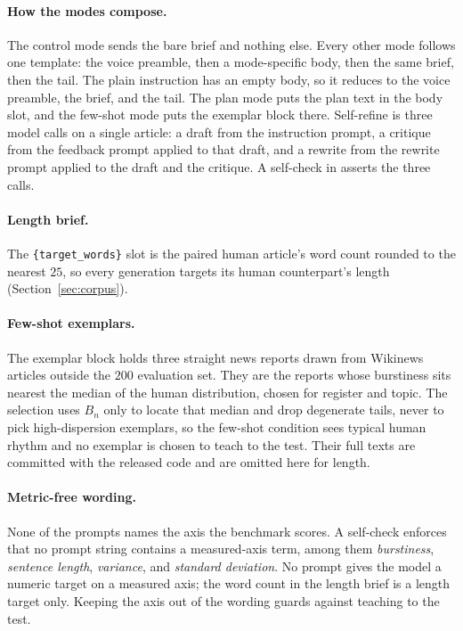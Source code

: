 \documentclass{article}
\begin{document}
\paragraph{How the modes compose.} The control mode sends the bare brief and nothing else. Every
other mode follows one template: the voice preamble, then a mode-specific body, then the same
brief, then the tail. The plain instruction has an empty body, so it reduces to the voice
preamble, the brief, and the tail. The plan mode puts the plan text in the body slot, and the
few-shot mode puts the exemplar block there. Self-refine is three model calls on a single
article: a draft from the instruction prompt, a critique from the feedback prompt applied to that
draft, and a rewrite from the rewrite prompt applied to the draft and the critique. A self-check
in  asserts the three calls.

\paragraph{Length brief.} The \texttt{\{target\_words\}} slot is the paired human article's word
count rounded to the nearest $25$, so every generation targets its human counterpart's length
(Section~\ref{sec:corpus}).

\paragraph{Few-shot exemplars.} The exemplar block holds three straight news reports drawn from
Wikinews articles outside the $200$ evaluation set. They are the reports whose burstiness sits
nearest the median of the human distribution, chosen for register and topic. The selection uses
$B_n$ only to locate that median and drop degenerate tails, never to pick high-dispersion
exemplars, so the few-shot condition sees typical human rhythm and no exemplar is chosen to teach
to the test. Their full texts are
committed with the released code and are omitted here for length.

\paragraph{Metric-free wording.} None of the prompts names the axis the benchmark scores. A
self-check enforces that no prompt string contains a measured-axis term, among them
\emph{burstiness}, \emph{sentence length}, \emph{variance}, and \emph{standard deviation}. No
prompt gives the model a numeric target on a measured axis; the word count in the length brief is
a length target only. Keeping the axis out of the wording guards against teaching to
the test.
\end{document}
